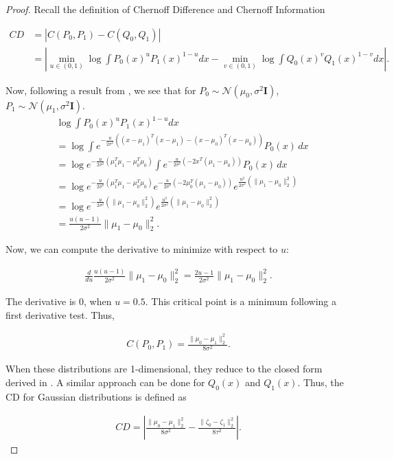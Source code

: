 \documentclass[11pt,letterpaper]{article}
\begin{document}
\begin{proof}
    Recall the definition of Chernoff Difference and Chernoff Information

    \begin{align}
        CD & = |C(P_0, P_1) - C(Q_0, Q_1)| \\ &= |\min_{u\in(0,1)}\log \int P_0(x)^uP_1(x)^{1-u}dx - \min_{v\in(0,1)}\log \int Q_0(x)^vQ_1(x)^{1-v}dx|.
    \end{align}

    Now, following a result from \citet{dutta2020there}, we see that for $P_0\sim\mathcal{N}(\mu_0,\sigma^2\mathbf{I})$, $P_1\sim\mathcal{N}(\mu_1,\sigma^2\mathbf{I})$.
    \begin{align}
        &\log \int P_0(x)^uP_1(x)^{1-u}dx \\&=  \log \int e^{-\frac{u}{2\sigma^2} \left( (x-\mu_1)^T(x-\mu_1) - (x-\mu_0)^T(x-\mu_0) \right)} P_0(x) \, dx \\
&= \log e^{-\frac{u}{2\sigma^2} \left( \mu_1^T \mu_1 - \mu_0^T \mu_0 \right)} 
    \int e^{-\frac{u}{2\sigma^2} \left( -2x^T(\mu_1 - \mu_0) \right)} P_0(x) \, dx \\
&= \log e^{-\frac{u}{2\sigma^2} \left( \mu_1^T \mu_1 - \mu_0^T \mu_0 \right)} 
    e^{-\frac{u}{2\sigma^2} \left( -2\mu_0^T(\mu_1 - \mu_0) \right)} 
    e^{\frac{u^2}{2\sigma^2} \left( \|\mu_1 - \mu_0\|_2^2 \right)} \\
&= \log e^{-\frac{u}{2\sigma^2} \left( \|\mu_1 - \mu_0\|_2^2 \right)} 
    e^{\frac{u^2}{2\sigma^2} \left( \|\mu_1 - \mu_0\|_2^2 \right)}\\& = \frac{u(u-1)}{2\sigma^2}\|\mu_1 - \mu_0\|_2^2.
    \end{align}

    Now, we can compute the derivative to minimize with respect to $u$:

    \begin{align}
        \frac{d}{du}\frac{u(u-1)}{2\sigma^2}\|\mu_1 - \mu_0\|_2^2 = \frac{2u-1}{2\sigma^2}\|\mu_1 - \mu_0\|_2^2.
    \end{align}

    The derivative is 0, when $u = 0.5$. This critical point is a minimum following a first derivative test. Thus, 

    \begin{align}
        C(P_0, P_1) = \frac{\|\mu_0 - \mu_1\|_2^2}{8\sigma^2}.
    \end{align}

    When these distributions are 1-dimensional, they reduce to the closed form derived in \citet{nielsen2022revisiting}. A similar approach can be done for $Q_0(x)$ and $Q_1(x)$. Thus, the CD for Gaussian distributions is defined as

    \begin{align}
        CD = |\frac{\|\mu_0 - \mu_1\|_2^2}{8\sigma^2} - \frac{\|\zeta_0 - \zeta_1\|_2^2}{8\tau^2}|.
    \end{align}
    
\end{proof}
\end{document}
